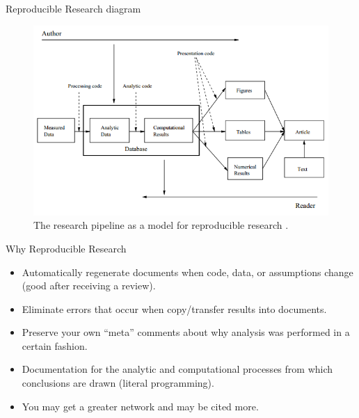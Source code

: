 \documentclass[10pt, compress]{beamer}
\begin{document}
\begin{frame}{Reproducible Research diagram}
\begin{figure}
\includegraphics[width=0.8\linewidth]{graphic/distrib_research_diagram}
\caption{The research pipeline as a model for reproducible research \cite{Peng09}.}
\end{figure}


\end{frame}


\begin{frame}{Why Reproducible Research}

\begin{itemize}[<+->]
\item Automatically regenerate documents when code, data, or assumptions change (good after receiving a review).
\item Eliminate errors that occur when copy/transfer results into documents.
\item Preserve your own ``meta'' comments about why analysis was performed in a certain fashion.
\item Documentation for the analytic and computational processes from which
  conclusions are drawn (literal programming).
\item You may get a greater network and may be cited more.
\end{itemize}

\end{frame}
\end{document}
